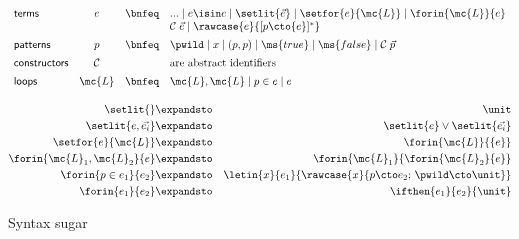 \begin{figure}
  \[\begin{array}{lccl}
  \textsf{terms} &
  e &\bnfeq& ... \pipe e \isin e \pipe \setlit{\vec{e}}
             \pipe \setfor{e}{\mc{L}}
             \pipe \forin{\mc{L}}{e}\\
  &&& \mathcal{C}\;\vec{e} \pipe \rawcase{e}{[{p} \cto {e}]^*}
  \vspace{0.5em}\\
  \textsf{patterns} &
  p &\bnfeq& \pwild \pipe x \pipe (p,p)
             \pipe \ms{true} \pipe \ms{false} \pipe \mathcal{C}\;\vec{p}
  \vspace{0.5em}\\
  \textsf{constructors} & \mathcal{C} && \text{are abstract identifiers}
  \vspace{0.5em}\\
  \textsf{loops} &
  \mc{L} &\bnfeq& \mc{L}, \mc{L} \pipe p \in e \pipe e
  \end{array}\]

  \begin{eqnarray*}
    \setlit{} &\expandsto& \unit\\
    \setlit{e,\vec{e_i}} &\expandsto& \setlit{e} \vee \setlit{\vec{e_i}}\\
    \setfor{e}{\mc{L}}       &\expandsto& \forin{\mc{L}}{\{e\}}\\
    \forin{\mc{L}_1,\mc{L}_2}{e}
    &\expandsto& \forin{\mc{L}_1}{\forin{\mc{L}_2}{e}}\\
    \forin{p\in e_1}{e_2} &\expandsto&
    \letin{x}{e_1}{\rawcase{x}{p \cto e_2;\,\pwild \cto \unit}}\\
    \forin{e_1}{e_2} &\expandsto& \ifthen{e_1}{e_2}{\unit}
  \end{eqnarray*}
  \caption{Syntax sugar}
  \label{fig:sugar}
\end{figure}

